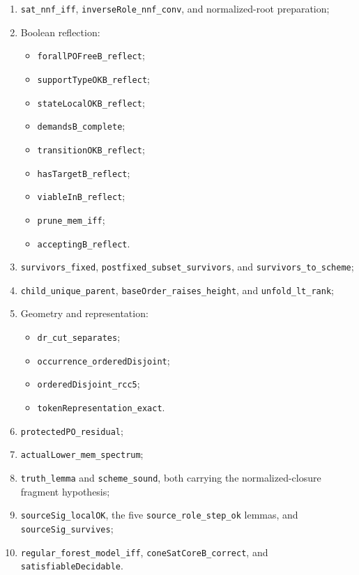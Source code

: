 \documentclass[11pt]{article}
\begin{document}
\begin{enumerate}
  \item \texttt{sat\_nnf\_iff},
        \texttt{inverseRole\_nnf\_conv}, and normalized-root preparation;
  \item Boolean reflection:
        \begin{itemize}
          \item \texttt{forallPOFreeB\_reflect};
          \item \texttt{supportTypeOKB\_reflect};
          \item \texttt{stateLocalOKB\_reflect};
          \item \texttt{demandsB\_complete};
          \item \texttt{transitionOKB\_reflect};
          \item \texttt{hasTargetB\_reflect};
          \item \texttt{viableInB\_reflect};
          \item \texttt{prune\_mem\_iff};
          \item \texttt{acceptingB\_reflect}.
        \end{itemize}
  \item \texttt{survivors\_fixed},
        \texttt{postfixed\_subset\_survivors}, and
        \texttt{survivors\_to\_scheme};
  \item \texttt{child\_unique\_parent}, \texttt{baseOrder\_raises\_height}, and
        \texttt{unfold\_lt\_rank};
  \item Geometry and representation:
        \begin{itemize}
          \item \texttt{dr\_cut\_separates};
          \item \texttt{occurrence\_orderedDisjoint};
          \item \texttt{orderedDisjoint\_rcc5};
          \item \texttt{tokenRepresentation\_exact}.
        \end{itemize}
  \item \texttt{protectedPO\_residual};
  \item \texttt{actualLower\_mem\_spectrum};
  \item \texttt{truth\_lemma} and \texttt{scheme\_sound}, both carrying the
        normalized-closure fragment hypothesis;
  \item \texttt{sourceSig\_localOK}, the five
        \texttt{source\_role\_step\_ok} lemmas, and
        \texttt{sourceSig\_survives};
  \item \texttt{regular\_forest\_model\_iff},
        \texttt{coneSatCoreB\_correct}, and \texttt{satisfiableDecidable}.
\end{enumerate}
\end{document}
